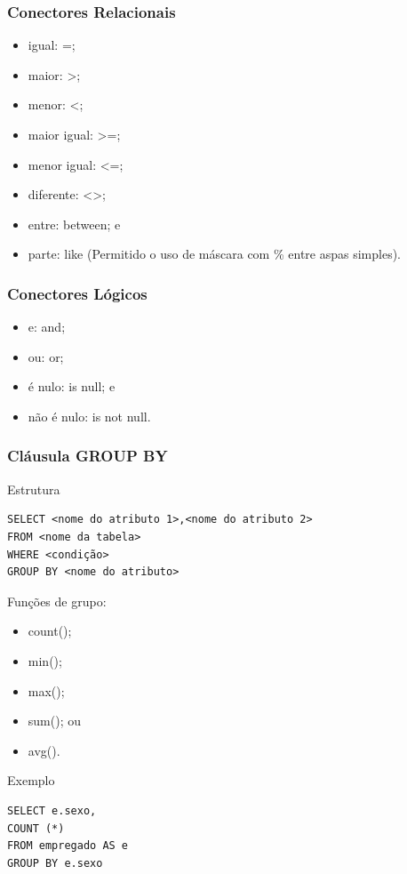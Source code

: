 \documentclass{beamer}
\begin{document}
\begin{frame}
\frametitle{Conectores Relacionais}

\begin{itemize}
\item igual: =;
\item maior: >;
\item menor: <;
\item maior igual: >=;
\item menor igual: <=;
\item diferente: <>;
\item entre: between; e
\item parte: like (Permitido o uso de máscara com \% entre aspas simples).
\end{itemize}
\end{frame}

\begin{frame}
\frametitle{Conectores Lógicos}

\begin{itemize}
\item e: and;
\item ou: or;
\item é nulo: is null; e
\item não é nulo: is not null.
\end{itemize}
\end{frame}

\begin{frame}[fragile]
\frametitle{Cláusula GROUP BY}

\begin{block}{Estrutura}
	\begin{lstlisting}
SELECT <nome do atributo 1>,<nome do atributo 2>
FROM <nome da tabela>
WHERE <condição>
GROUP BY <nome do atributo>
	\end{lstlisting}
\end{block}\vfill

Funções de grupo:
\begin{itemize}
	\item count();
	\item min();
	\item max();
	\item sum(); ou
	\item avg().
\end{itemize}\vfill

\begin{exampleblock}{Exemplo}
	\begin{lstlisting}
SELECT e.sexo,
COUNT (*)
FROM empregado AS e
GROUP BY e.sexo
	\end{lstlisting}
\end{exampleblock}
\end{frame}
\end{document}
